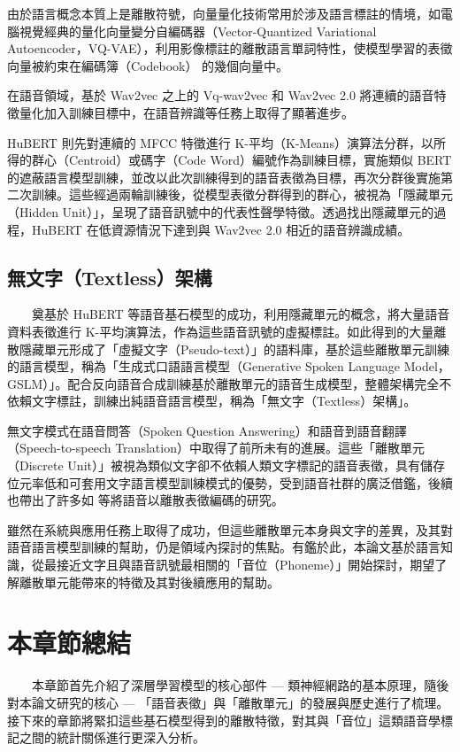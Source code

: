         由於語言概念本質上是離散符號，向量量化技術常用於涉及語言標註的情境，如電腦視覺經典的量化向量變分自編碼器（Vector-Quantized Variational Autoencoder，VQ-VAE）\cite{van2017neural}，利用影像標註的離散語言單詞特性，使模型學習的表徵向量被約束在編碼簿（Codebook） 的幾個向量中。

        在語音領域，基於 Wav2vec 之上的 Vq-wav2vec \cite{baevski2019vq} 和 Wav2vec 2.0 將連續的語音特徵量化加入訓練目標中，在語音辨識等任務上取得了顯著進步。

        HuBERT \cite{hsu_hubert_2021-2} 則先對連續的 MFCC 特徵進行 K-平均（K-Means）演算法分群，以所得的群心（Centroid）或碼字（Code Word）編號作為訓練目標，實施類似 BERT 的遮蔽語言模型訓練，並改以此次訓練得到的語音表徵為目標，再次分群後實施第二次訓練。這些經過兩輪訓練後，從模型表徵分群得到的群心，被視為「隱藏單元（Hidden Unit）」，呈現了語音訊號中的代表性聲學特徵。透過找出隱藏單元的過程，HuBERT 在低資源情況下達到與 Wav2vec 2.0 相近的語音辨識成績。

\subsection{無文字（Textless）架構}

　　奠基於 HuBERT 等語音基石模型的成功，利用隱藏單元的概念，將大量語音資料表徵進行 K-平均演算法，作為這些語音訊號的虛擬標註。如此得到的大量離散隱藏單元形成了「虛擬文字（Pseudo-text）」的語料庫，基於這些離散單元訓練的語言模型，稱為「生成式口語語言模型（Generative Spoken Language Model，GSLM）」\cite{lakhotia_generative_2021-1}。配合反向語音合成訓練基於離散單元的語音生成模型，整體架構完全不依賴文字標註，訓練出純語音語言模型，稱為「無文字（Textless）架構」\cite{noauthor_textless_2021}。

        無文字模式在語音問答（Spoken Question Answering）\cite{lin2022dual}和語音到語音翻譯 （Speech-to-speech Translation）\cite{chen_speech--speech_2023}中取得了前所未有的進展。這些「離散單元（Discrete Unit）」被視為類似文字卻不依賴人類文字標記的語音表徵，具有儲存位元率低和可套用文字語言模型訓練模式的優勢，受到語音社群的廣泛借鑑，後續也帶出了許多如\cite{zhang2024speechtokenizer} 等將語音以離散表徵編碼的研究。

        雖然在系統與應用任務上取得了成功，但這些離散單元本身與文字的差異，及其對語音語言模型訓練的幫助，仍是領域內探討的焦點。有鑑於此，本論文基於語言知識，從最接近文字且與語音訊號最相關的「音位（Phoneme）」開始探討，期望了解離散單元能帶來的特徵及其對後續應用的幫助。

\section{本章節總結}

　　本章節首先介紹了深層學習模型的核心部件 --- 類神經網路的基本原理，隨後對本論文研究的核心 --- 「語音表徵」與「離散單元」的發展與歷史進行了梳理。接下來的章節將緊扣這些基石模型得到的離散特徵，對其與「音位」這類語音學標記之間的統計關係進行更深入分析。
